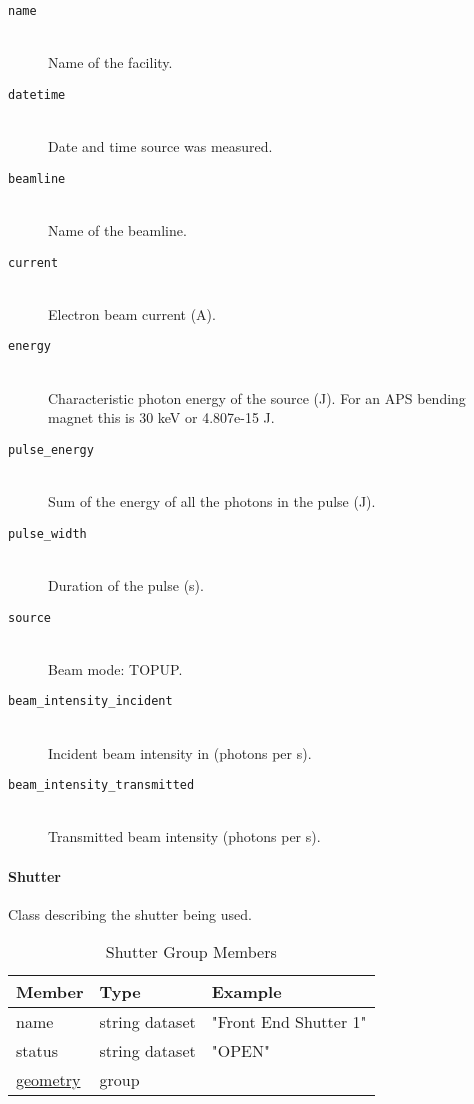 \begin{description}

\item[\tt {name}] \hfill \\
{Name of the facility.}

\item[\tt {datetime}] \hfill \\
{Date and time source was measured.}

\item[\tt {beamline}] \hfill \\
{Name of the beamline.}

\item[\tt {current}] \hfill \\
{Electron beam current (A).}

\item[\tt {energy}] \hfill \\
{Characteristic photon energy of the source (J). For an APS bending magnet this
is 30 keV or 4.807e-15 J.}

\item[\tt {pulse\_energy}] \hfill \\
{Sum of the energy of all the photons in the pulse (J).}

\item[\tt {pulse\_width}] \hfill \\
{Duration of the pulse (s).}

\item[\tt {source}] \hfill \\
{Beam mode: TOPUP.}

\item[\tt {beam\_intensity\_incident}] \hfill \\
{Incident beam intensity in (photons per s).}

\item[\tt {beam\_intensity\_transmitted}] \hfill \\
{Transmitted beam intensity (photons per s).}
\end{description}


\paragraph{Shutter}
\label{table:shutter}

Class describing the shutter being used.

\begin{table}[h!]\sffamily \footnotesize
\centering
\caption{Shutter Group Members}
\begin{tabular}{l l l}
\toprule
\bfseries Member     & \bfseries Type & \bfseries Example \\
\midrule
name & string dataset & "Front End Shutter 1" \\ 
status & string dataset & "OPEN" \\
\hyperref[table:geometry]{geometry} &  group & \\
\bottomrule
\end{tabular}
\end{table}

